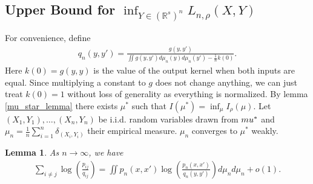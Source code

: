 \documentclass[10pt]{article}
\newtheorem{lemma}{\bf Lemma}
\newenvironment{Proof of lemma}{\noindent{\bf Proof of Lemma}}{\hfill$\Box$\newline}
\newenvironment{Proof of claim}{\noindent{\bf Proof of claim}}{\hfill$\Box$\newline}
\newenvironment{Proof of theorem}{\noindent{\bf Proof of Theorem}}{\hfill\scriptsize{$\Box$}\newline}
\newenvironment{Proof of theorems}{\noindent{\bf Proof of Theorems}}{\hfill$\Box$\newline}
\newenvironment{Proof of proposition}{\noindent{\bf Proof of Proposition}}{\hfill$\Box$\newline}
\newenvironment{Proof of propositions}{\noindent{\bf Proof of Propositions}}{\hfill$\Box$\newline}
\newenvironment{Proof of exercise}{\noindent{\it Proof of Exercise:}}{\hfill$\Box$}
\numberwithin{equation}{section}
\begin{document}
\subsection{Upper Bound for \texorpdfstring{$\inf_{Y \in (\mathbb{R}^s)^n}L_{n,\rho}(X,Y)$}{L(X,Y)}} \label{tsne:sec:upper_bound}
For convenience, define
\begin{align}
    q_n(y,y') = \frac{g(y,y')}{\iint g(y,y')d \mu_n(y) d \mu_n (y') - \frac{1}{n}k(0)}.
\end{align}
Here $k(0) = g(y,y)$ is the value of the output kernel when both inputs are equal. Since multiplying a constant to $g$ does not change anything, we can just treat $k(0)=1$ without loss of generality as everything is normalized.
By lemma \ref{mu_star_lemma} there exists $\mu^*$ such that $I(\mu^*) = \inf_{\mu}I_{\rho}(\mu)$. Let $(X_1,Y_1), \dots, (X_n,Y_n)$ be i.i.d. random variables drawn from $\\mu^*$ and $\mu_n = \frac{1}{n} \sum_{i=1}^n \delta_{(X_i,Y_i)}$ their empirical measure. $\mu_n$ converges to $\mu^*$ weakly.
\begin{lemma} \label{int_approx_lemma_2}
    As $n \to \infty$, we have
    \begin{align}
        \sum_{i \neq j} \log \left(\frac{p_{ij}}{q_{ij}}\right) = \iint p_n(x,x') \log \left(\frac{p_n(x,x')}{q_n(y,y')}\right) d\mu_n d\mu_n + o(1).
    \end{align}
\end{lemma}
\end{document}
